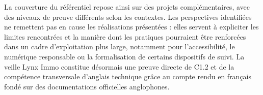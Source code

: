 La couverture du référentiel repose ainsi sur des projets complémentaires, avec des niveaux de preuve différents selon les contextes. Les perspectives identifiées ne remettent pas en cause les réalisations présentées : elles servent à expliciter les limites rencontrées et la manière dont les pratiques pourraient être renforcées dans un cadre d'exploitation plus large, notamment pour l'accessibilité, le numérique responsable ou la formalisation de certains dispositifs de suivi. La veille Lynx Immo constitue désormais une preuve directe de C1.2 et de la compétence transversale d'anglais technique grâce au compte rendu en français fondé sur des documentations officielles anglophones.
